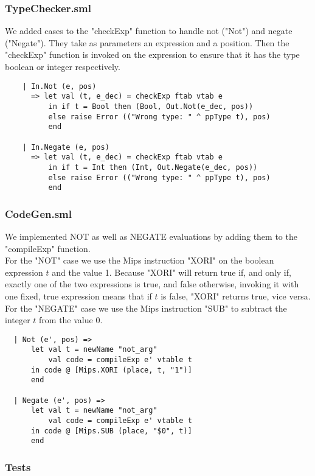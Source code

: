 \documentclass[12pt]{article}
\begin{document}
\subsubsection{TypeChecker.sml}
We added cases to the "checkExp" function to handle not ("Not") and negate ("Negate"). They take as parameters an expression and a position. Then the "checkExp" function is invoked on the expression to ensure that it has the type boolean or integer respectively.
\begin{verbatim}
    | In.Not (e, pos)
      => let val (t, e_dec) = checkExp ftab vtab e
          in if t = Bool then (Bool, Out.Not(e_dec, pos))
          else raise Error (("Wrong type: " ^ ppType t), pos) 
          end

    | In.Negate (e, pos)
      => let val (t, e_dec) = checkExp ftab vtab e
          in if t = Int then (Int, Out.Negate(e_dec, pos))
          else raise Error (("Wrong type: " ^ ppType t), pos) 
          end
\end{verbatim}
\subsubsection{CodeGen.sml}
We implemented NOT as well as NEGATE evaluations by adding them to the "compileExp" function. \\

For the "NOT" case we use the Mips instruction "XORI" on the boolean expression \(t\) and the value 1. Because "XORI" will return true if, and only if, exactly one of the two expressions is true, and false otherwise, invoking it with one fixed, true expression means that if \(t\) is false, "XORI" returns true, vice versa. \\

For the "NEGATE" case we use the Mips instruction "SUB" to subtract the integer \(t\) from the value 0. 
\begin{verbatim}
  | Not (e', pos) =>
      let val t = newName "not_arg"
          val code = compileExp e' vtable t
      in code @ [Mips.XORI (place, t, "1")]
      end
      
  | Negate (e', pos) =>
      let val t = newName "not_arg"
          val code = compileExp e' vtable t
      in code @ [Mips.SUB (place, "$0", t)]
      end
\end{verbatim}
\subsubsection{Tests}
\end{document}
